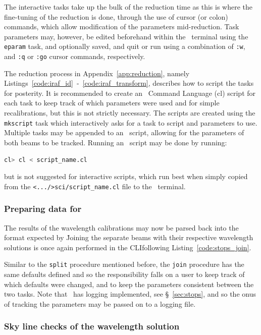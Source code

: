 The interactive tasks take up the bulk of the reduction time as this is where the fine-tuning of the reduction is done, through the use of cursor (or colon) commands, which allow modification of the parameters mid-reduction. Task parameters may, however, be edited beforehand within the \iraf\ terminal using the \texttt{eparam} task, and optionally saved, and quit or run using a combination of \texttt{:w}, and \texttt{:q} or \texttt{:go} cursor commands, respectively.

The reduction process in Appendix~\ref{app:reduction}, namely Listings~\ref{code:iraf_id}~-~\ref{code:iraf_transform}, describes how to script the tasks for posterity. It is recommended to create an \iraf\ Command Language (cl) script for each task to keep track of which parameters were used and for simple recalibrations, but this is not strictly necessary. The scripts are created using the \texttt{mkscript} task which interactively asks for a task to script and parameters to use. Multiple tasks may be appended to an \iraf\ script, allowing for the parameters of both beams to be tracked. Running an \iraf\ script may be done by running:
\begin{lstlisting}[language=bash]
cl> cl < script_name.cl
\end{lstlisting}
{\parskip=0pt
but is not suggested for interactive scripts, which run best when simply copied from the \texttt{<.../>sci/script\_name.cl} file to the \iraf\ terminal.
}

\subsubsection{Preparing data for \polsalt}

The results of the wavelength calibrations may now be parsed back into the format expected by \polsalt\. Joining the separate beams with their respective wavelength solutions is once again performed in the \gls{CLI}following Listing~\ref{code:stops_join}.

Similar to the \texttt{split} procedure mentioned before, the \texttt{join} procedure has the same defaults defined and so the responsibility falls on a user to keep track of which defaults were changed, and to keep the parameters consistent between the two tasks. Note that \stops\ has logging implemented, see \S~\ref{sec:stops}, and so the onus of tracking the parameters may be passed on to a logging file.

\subsubsection{Sky line checks of the wavelength solution}

